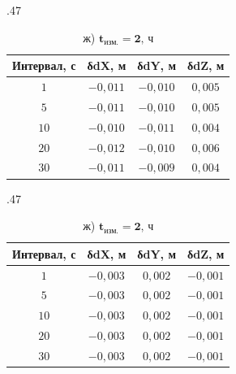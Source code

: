 \begin{table} [htbp]
{			\hfill
\begin{subtable}{.47\linewidth}	
	\centering
	\caption*{$\mathbf{t_\text{изм.}=1\text{, ч}}$}
	\begin{tabular}{|c|c|c|c|}
		\hline
		\textbf{Интервал, с}	& \textbf{δdX, м}	& \textbf{δdY, м}	& \textbf{δdZ, м}	\\ \hline
		$ 1$					& $-0,011$			& $-0,010$			& $ 0,005$			\\ \hline
		$ 5$					& $-0,011$			& $-0,010$			& $ 0,005$			\\ \hline
		$10$					& $-0,010$			& $-0,011$			& $ 0,004$			\\ \hline
		$20$					& $-0,012$			& $-0,010$			& $ 0,006$			\\ \hline
		$30$					& $-0,011$			& $-0,009$			& $ 0,004$			\\ \hline
	\end{tabular}
\end{subtable}%
\qquad
\begin{subtable}{.47\linewidth}	
	\centering
	\caption*{ж) $\mathbf{t_\text{изм.}=2\text{, ч}}$}
	\begin{tabular}{|c|c|c|c|}
		\hline
		\textbf{Интервал, с}	& \textbf{δdX, м}	& \textbf{δdY, м}	& \textbf{δdZ, м}	\\ \hline
		$ 1$					& $-0,003$			& $ 0,002$			& $-0,001$			\\ \hline
		$ 5$					& $-0,003$			& $ 0,002$			& $-0,001$			\\ \hline
		$10$					& $-0,003$			& $ 0,002$			& $-0,001$			\\ \hline
		$20$					& $-0,003$			& $ 0,002$			& $-0,001$			\\ \hline
		$30$					& $-0,003$			& $ 0,002$			& $-0,001$			\\ \hline
	\end{tabular}
\end{subtable}\hfill%

			
			
			
			
%		
	}
\end{table}

